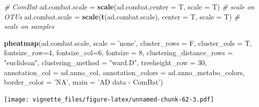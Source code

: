\documentclass[]{book}
\newenvironment{Shaded}{\begin{snugshade}}{\end{snugshade}}
\newcommand{\KeywordTok}[1]{\textcolor[rgb]{0.13,0.29,0.53}{\textbf{#1}}}
\newcommand{\DataTypeTok}[1]{\textcolor[rgb]{0.13,0.29,0.53}{#1}}
\newcommand{\DecValTok}[1]{\textcolor[rgb]{0.00,0.00,0.81}{#1}}
\newcommand{\StringTok}[1]{\textcolor[rgb]{0.31,0.60,0.02}{#1}}
\newcommand{\CommentTok}[1]{\textcolor[rgb]{0.56,0.35,0.01}{\textit{#1}}}
\newcommand{\NormalTok}[1]{#1}
\begin{document}
\begin{Shaded}
\begin{Highlighting}[]
\CommentTok{# ComBat}
\NormalTok{ad.combat.scale =}\StringTok{ }\KeywordTok{scale}\NormalTok{(ad.combat,}\DataTypeTok{center =}\NormalTok{ T, }\DataTypeTok{scale =}\NormalTok{ T) }\CommentTok{# scale on OTUs}
\NormalTok{ad.combat.scale =}\StringTok{ }\KeywordTok{scale}\NormalTok{(}\KeywordTok{t}\NormalTok{(ad.combat.scale), }\DataTypeTok{center =}\NormalTok{ T, }\DataTypeTok{scale =}\NormalTok{ T) }\CommentTok{# scale on samples}

\KeywordTok{pheatmap}\NormalTok{(ad.combat.scale, }
         \DataTypeTok{scale =} \StringTok{'none'}\NormalTok{, }
         \DataTypeTok{cluster_rows =}\NormalTok{ F, }
         \DataTypeTok{cluster_cols =}\NormalTok{ T, }
         \DataTypeTok{fontsize_row=}\DecValTok{4}\NormalTok{, }\DataTypeTok{fontsize_col=}\DecValTok{6}\NormalTok{,}
         \DataTypeTok{fontsize =} \DecValTok{8}\NormalTok{,}
         \DataTypeTok{clustering_distance_rows =} \StringTok{"euclidean"}\NormalTok{,}
         \DataTypeTok{clustering_method =} \StringTok{"ward.D"}\NormalTok{,}
         \DataTypeTok{treeheight_row =} \DecValTok{30}\NormalTok{,}
         \DataTypeTok{annotation_col =}\NormalTok{ ad.anno_col,}
         \DataTypeTok{annotation_colors =}\NormalTok{ ad.anno_metabo_colors,}
         \DataTypeTok{border_color =} \StringTok{'NA'}\NormalTok{,}
         \DataTypeTok{main =} \StringTok{'AD data - ComBat'}\NormalTok{)}
\end{Highlighting}
\end{Shaded}

\texttt{[image: vignette\_files/figure-latex/unnamed-chunk-62-3.pdf]}
\end{document}
